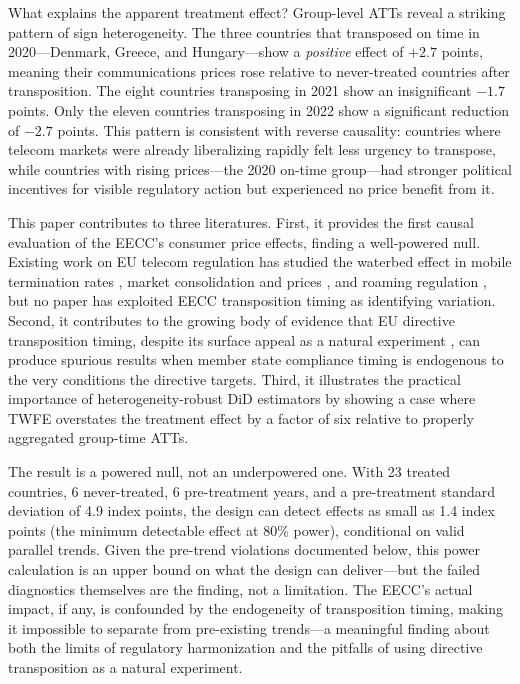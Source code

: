 \documentclass[12pt]{article}
\begin{document}
What explains the apparent treatment effect? Group-level ATTs reveal a striking pattern of sign heterogeneity. The three countries that transposed on time in 2020---Denmark, Greece, and Hungary---show a \textit{positive} effect of $+2.7$ points, meaning their communications prices rose relative to never-treated countries after transposition. The eight countries transposing in 2021 show an insignificant $-1.7$ points. Only the eleven countries transposing in 2022 show a significant reduction of $-2.7$ points. This pattern is consistent with reverse causality: countries where telecom markets were already liberalizing rapidly felt less urgency to transpose, while countries with rising prices---the 2020 on-time group---had stronger political incentives for visible regulatory action but experienced no price benefit from it.

This paper contributes to three literatures. First, it provides the first causal evaluation of the EECC's consumer price effects, finding a well-powered null. Existing work on EU telecom regulation has studied the waterbed effect in mobile termination rates \citep{genakos2011, genakos2015}, market consolidation and prices \citep{genakos2018}, and roaming regulation \citep{quinn2024, canzian2024}, but no paper has exploited EECC transposition timing as identifying variation. Second, it contributes to the growing body of evidence that EU directive transposition timing, despite its surface appeal as a natural experiment \citep{konig2006domestic, toshkov2008embracing, thomann2019customizing}, can produce spurious results when member state compliance timing is endogenous to the very conditions the directive targets. Third, it illustrates the practical importance of heterogeneity-robust DiD estimators \citep{callaway2021, goodmanbacon2021, sun2021} by showing a case where TWFE overstates the treatment effect by a factor of six relative to properly aggregated group-time ATTs.

The result is a powered null, not an underpowered one. With 23 treated countries, 6 never-treated, 6 pre-treatment years, and a pre-treatment standard deviation of 4.9 index points, the design can detect effects as small as 1.4 index points (the minimum detectable effect at 80\% power), conditional on valid parallel trends. Given the pre-trend violations documented below, this power calculation is an upper bound on what the design can deliver---but the failed diagnostics themselves are the finding, not a limitation. The EECC's actual impact, if any, is confounded by the endogeneity of transposition timing, making it impossible to separate from pre-existing trends---a meaningful finding about both the limits of regulatory harmonization and the pitfalls of using directive transposition as a natural experiment.
\end{document}
